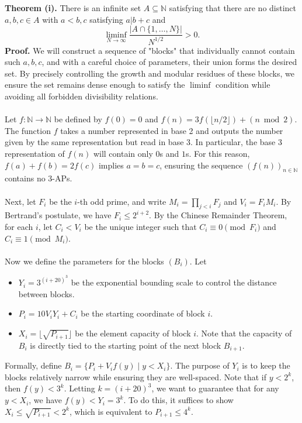 
\noindent \textbf{Theorem \upshape(i).} There is an infinite set $A \subseteq \mathbb{N}$ satisfying that there are no distinct $a,b,c \in A$ with $a < b,c$ satisfying $a | b + c$ and
$$\liminf_{N \to \infty} \frac{|A \cap \{1, \dots, N\}|}{N^{1/2}} > 0.$$
\noindent \textbf{Proof.}
We will construct a sequence of "blocks" that individually cannot contain such $a,b,c$, and with a careful choice of parameters, their union forms the desired set. By precisely controlling the growth and modular residues of these blocks, we ensure the set remains dense enough to satisfy the $\liminf$ condition while avoiding all forbidden divisibility relations.
\\\\
Let $f : \mathbb{N} \to \mathbb{N}$ be defined by $f(0) = 0$ and $f(n) = 3f(\lfloor n/2 \rfloor) + (n \bmod 2)$. The function $f$ takes a number represented in base 2 and outputs the number given by the same representation but read in base 3. In particular, the base 3 representation of $f(n)$ will contain only $0$s and $1$s. For this reason, $f(a) + f(b) = 2f(c)$ implies $a = b = c$, ensuring the sequence $(f(n))_{n \in \mathbb{N}}$ contains no 3-APs.
\\\\
Next, let $F_i$ be the $i$-th odd prime, and write $M_i = \prod_{j < i} F_j$ and $V_i = F_i M_i$. By Bertrand's postulate, we have $F_i \le 2^{i + 2}$. By the Chinese Remainder Theorem, for each $i$, let $C_i < V_i$ be the unique integer such that $C_i \equiv 0 \pmod{F_i}$ and $C_i \equiv 1 \pmod{M_i}$.
\\\\
Now we define the parameters for the blocks $(B_i)$. Let
\begin{itemize}
    \item $Y_i = 3^{(i + 20)^3}$ be the exponential bounding scale to control the distance between blocks.
    \item $P_i = 10V_iY_i + C_i$ be the starting coordinate of block $i$.
    \item $X_i = \lfloor \sqrt{P_{i + 1}} \rfloor$ be the element capacity of block $i$. Note that the capacity of $B_i$ is directly tied to the starting point of the next block $B_{i+1}$.
\end{itemize}
Formally, define $B_i = \{P_i + V_if(y) \mid y < X_i\}$. The purpose of $Y_i$ is to keep the blocks relatively narrow while ensuring they are well-spaced. Note that if $y < 2^k$, then $f(y) < 3^k$. Letting $k = (i + 20)^3$, we want to guarantee that for any $y < X_i$, we have $f(y) < Y_i = 3^k$. To do this, it suffices to show $X_i \le \sqrt{P_{i+1}} < 2^k$, which is equivalent to $P_{i+1} \le 4^k$. 
